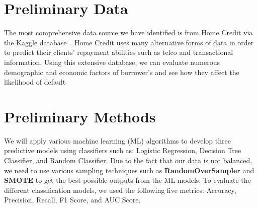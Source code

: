 \documentclass{article}
\begin{document}
\section{Preliminary Data}

The most comprehensive data source we have identified is from Home Credit via the Kaggle database~\cite{home-credit-default-risk}. Home Credit uses many alternative forms of data in order to predict their clients' repayment abilities such as telco and transactional information. Using this extensive database, we can evaluate numerous demographic and economic factors of borrower's and see how they affect the likelihood of default

\section{Preliminary Methods}

We will apply various machine learning (ML) algorithms to develop three predictive models using classifiers such as: Logistic Regression, Decision Tree Classifier, and Random Classifier. Due to the fact that our data is not balanced, we need to use various sampling techniques such as \textbf{RandomOverSampler} and \textbf{SMOTE} to get the best possible outputs from the ML models. To evaluate the different classification models, we used the following five metrics: Accuracy, Precision, Recall, F1 Score, and AUC Score. 




\end{document}
